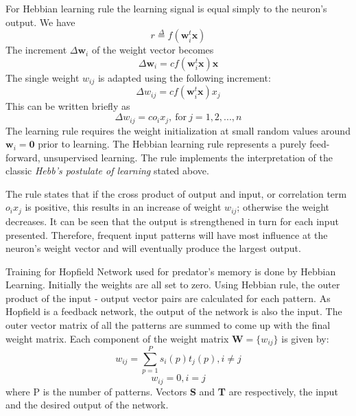 For Hebbian learning rule the learning signal is equal simply to the neuron's output. We have
\begin{equation}
	r \overset{\Delta}{=} f(\textbf{w}_i^t \textbf{x})
\end{equation}
The increment \(\Delta\textbf{w}_i\) of the weight vector becomes
\begin{equation}
	\Delta\textbf{w}_i = cf(\textbf{w}_i^t \textbf{x})\textbf{x}
\end{equation}
The single weight \( w_{ij} \) is adapted using the following increment:
\begin{equation}
	\Delta\textit{w}_{ij} = cf(\textbf{w}_i^t \textbf{x})x_j
\end{equation}
This can be written briefly as 
\begin{equation}
	\Delta\textit{w}_{ij} = c o_i x_j, \> \text{for} \> j = 1, 2, ..., n
\end{equation}
The learning rule requires the weight initialization at small random values around \( \textbf{w}_i = \textbf{0}\) prior to learning. The Hebbian learning rule represents a purely feed-forward, unsupervised learning. The rule implements the interpretation of the classic \textit{Hebb's postulate of learning} stated above. 

The rule states that if the cross product of output and input, or correlation term \(o_ix_j\) is positive, this results in an increase of weight \(w_{ij}\); otherwise the weight decreases. It can be seen that the output is strengthened in turn for each input presented. Therefore, frequent input patterns will have most influence at the neuron's weight vector and will eventually produce the largest output.

Training for Hopfield Network used for predator's memory is done by Hebbian Learning. Initially the weights are all set to zero. Using Hebbian rule, the outer product of the input - output vector pairs are calculated for each pattern. As Hopfield is a feedback network, the output of the network is also the input. The outer vector matrix of all the patterns are summed to come up with the final weight matrix. Each component of the weight matrix \(\textbf{W} = \{w_{ij}\}\) is given by:
\begin{equation}
w_{ij} = \sum_{p=1}^{P} s_i(p) t_j(p), i \neq j
\end{equation}
\[
w_{ij} = 0, i = j
\]
where P is the number of patterns. Vectors \textbf{S} and \textbf{T} are respectively, the input and the desired output of the network.

